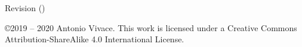 \documentclass[a4, oneside, 10pt]{memoir}
\begin{document}



\frontmatter





Revision \texttt{\revision} (\texttt{\revisiondate})

\tableofcontents*
\thispagestyle{empty}

\mainmatter






\pagebreak
\listoffigures




\pagebreak
\thispagestyle{empty}
\noindent
\copyright 2019 -- 2020 Antonio Vivace. This work is licensed under a Creative Commons Attribution-ShareAlike 4.0 International License.
\end{document}

